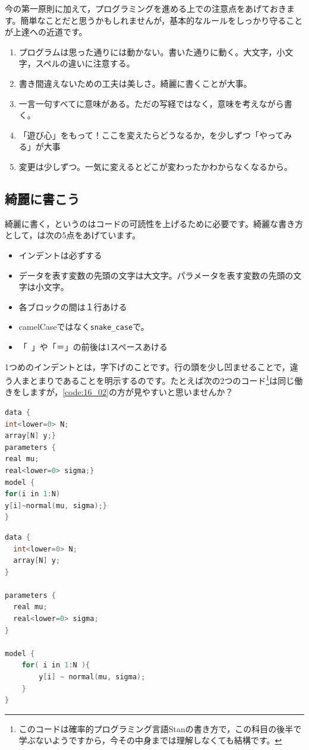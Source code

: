 \documentclass{ltjsbook}
\begin{document}
今の第一原則に加えて，プログラミングを進める上での注意点をあげておきます。簡単なことだと思うかもしれませんが，基本的なルールをしっかり守ることが上達への近道です。
\begin{enumerate}
	\item プログラムは思った通りには動かない。書いた通りに動く。大文字，小文字，スペルの違いに注意する。
	\item 書き間違えないための工夫は美しさ。綺麗に書くことが大事。
	\item 一言一句すべてに意味がある。ただの写経ではなく，意味を考えながら書く。
	\item 「遊び心」をもって！ここを変えたらどうなるか，を少しずつ「やってみる」が大事
	\item 変更は少しずつ。一気に変えるとどこが変わったかわからなくなるから。
\end{enumerate}

\subsection{綺麗に書こう}
綺麗に書く，というのはコードの可読性を上げるために必要です。綺麗な書き方として，\textcite{Matsuura201610}は次の5点をあげています。

\begin{itemize}
	\item インデントは必ずする
	\item データを表す変数の先頭の文字は大文字。パラメータを表す変数の先頭の文字は小文字。
	\item 各ブロックの間は１行あける
	\item camelCaseではなく\verb|snake_case|で。
	\item 「~」や「＝」の前後は1スペースあける
\end{itemize}

1つめのインデントとは，字下げのことです。行の頭を少し凹ませることで，違う人まとまりであることを明示するのです。たとえば次の2つのコード\footnote{このコードは確率的プログラミング言語Stanの書き方で，この科目の後半で学ぶないようですから，今その中身までは理解しなくても結構です。}は同じ働きをしますが，\ref{code:16_02}の方が見やすいと思いませんか？
\begin{lstlisting}[language=c++,label={code:16_01},caption={インデントのないコード}]
data {
int<lower=0> N;
array[N] y;}
parameters {
real mu;
real<lower=0> sigma;}
model {
for(i in 1:N)
y[i]~normal(mu, sigma);}
}
\end{lstlisting}


\begin{lstlisting}[language=c++,label={code:16_02},caption={インデントのあるコード}]
data {
  int<lower=0> N;
  array[N] y;
}

parameters {
  real mu;
  real<lower=0> sigma;
}

model {
    for( i in 1:N ){
        y[i] ~ normal(mu, sigma);
    }
}
\end{lstlisting}
\end{document}
